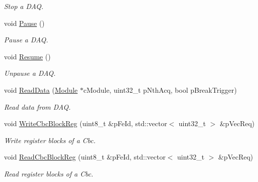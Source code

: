 \begin{DoxyCompactItemize}
\begin{DoxyCompactList}\small\item\em Stop a D\-A\-Q. \end{DoxyCompactList}\item 
void \hyperlink{class_ph2___hw_interface_1_1_glib_f_w_interface_a05d7f790e0316b51714293e8089086f3}{Pause} ()
\begin{DoxyCompactList}\small\item\em Pause a D\-A\-Q. \end{DoxyCompactList}\item 
void \hyperlink{class_ph2___hw_interface_1_1_glib_f_w_interface_aedd3abfb576016701da27fabc975ac13}{Resume} ()
\begin{DoxyCompactList}\small\item\em Unpause a D\-A\-Q. \end{DoxyCompactList}\item 
void \hyperlink{class_ph2___hw_interface_1_1_glib_f_w_interface_afec88a0a2036c99d84bc1895c3f173eb}{Read\-Data} (\hyperlink{class_ph2___hw_description_1_1_module}{Module} $\ast$c\-Module, uint32\-\_\-t p\-Nth\-Acq, bool p\-Break\-Trigger)
\begin{DoxyCompactList}\small\item\em Read data from D\-A\-Q. \end{DoxyCompactList}\item 
void \hyperlink{class_ph2___hw_interface_1_1_glib_f_w_interface_a1a43546404b9097fafa83302cd326e4c}{Write\-Cbc\-Block\-Reg} (uint8\-\_\-t \&p\-Fe\-Id, std\-::vector$<$ uint32\-\_\-t $>$ \&p\-Vec\-Req)
\begin{DoxyCompactList}\small\item\em Write register blocks of a Cbc. \end{DoxyCompactList}\item 
void \hyperlink{class_ph2___hw_interface_1_1_glib_f_w_interface_af1fc5669e98ae17f235c47f08ac256c0}{Read\-Cbc\-Block\-Reg} (uint8\-\_\-t \&p\-Fe\-Id, std\-::vector$<$ uint32\-\_\-t $>$ \&p\-Vec\-Req)
\begin{DoxyCompactList}\small\item\em Read register blocks of a Cbc. \end{DoxyCompactList}\end{DoxyCompactItemize}
